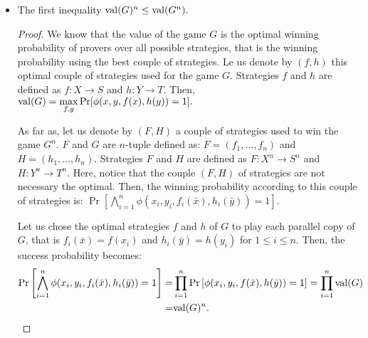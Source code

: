 \begin{itemize}
\item The first inequality $\mathrm{val} (G)^n \leq \mathrm{val} (G^n) .$

\begin{proof}
We know that the value of the game $G$ is the optimal winning probability of provers over all possible strategies, that is the winning probability using the best couple of strategies. Le us denote by $(f,h)$ this optimal couple of strategies used for the game $G$. Strategies $f$ and $h$ are  defined as $f: X\longrightarrow S$ and  $h: Y\longrightarrow T.$  Then, $\mathrm{val} (G)= \max\limits_{f,g} \Pr[\phi(x,y,f(x),h(y))=1].$

As far as, let us denote by $(F,H)$ a couple of strategies  used  to win the game $G^n$. $F$ and $G$ are $n$-tuple defined as: $F=(f_1, \ldots, f_n)$ and  $H=(h_1, \ldots, h_n)$. Strategies $F$ and $H$ are  defined as $F: X^n\longrightarrow S^n$ and  $H: Y^n\longrightarrow T^n.$ Here, notice that the couple $(F,H)$ of strategies are not necessary the optimal.
Then, the winning probability according to this couple of strategies is: $\Pr \left[\bigwedge\limits_{i=1}^n \phi (x_i,y_i, f_i(\bar{x}), h_i(\bar{y}))=1 \right].$

%


Let us chose the optimal strategies $f$ and $h$ of $G$ to play each parallel copy of $G$, that is $f_i (\bar{x})=f(x_i)$ and $h_i (\bar{y})=h (y_i)$ for $ 1\leq i \leq n$. Then, the success probability becomes:
\begin{align*}
\Pr \left[\bigwedge\limits_{i=1}^n \phi (x_i,y_i, f_i(\bar{x}), h_i(\bar{y}))=1 \right] = &   \prod\limits_{i=1}^n \Pr \left[ \phi (x_i,y_i, f(\bar{x}), h(\bar{y}))=1 \right] =  \prod\limits_{i=1}^n \mathrm{val} (G) \\
= & \mathrm{val} (G)^n.
\end{align*}


\end{proof}
\end{itemize}

